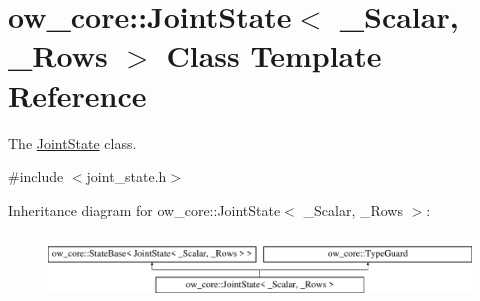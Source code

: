 \hypertarget{classow__core_1_1JointState}{}\section{ow\+\_\+core\+:\+:Joint\+State$<$ \+\_\+\+Scalar, \+\_\+\+Rows $>$ Class Template Reference}
\label{classow__core_1_1JointState}


The \hyperlink{classow__core_1_1JointState}{Joint\+State} class.  




{\ttfamily \#include $<$joint\+\_\+state.\+h$>$}

Inheritance diagram for ow\+\_\+core\+:\+:Joint\+State$<$ \+\_\+\+Scalar, \+\_\+\+Rows $>$\+:\begin{figure}[H]
\begin{center}
\leavevmode
\includegraphics[height=1.728395cm]{d5/d1d/classow__core_1_1JointState}
\end{center}
\end{figure}

